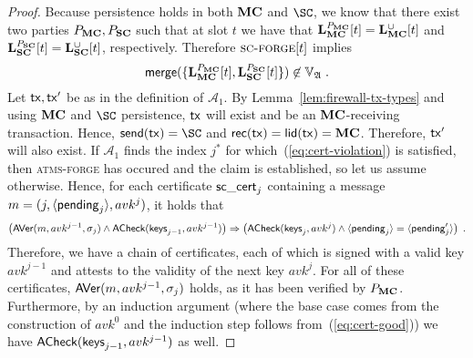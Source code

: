 \begin{proof}
  \noindent
  Because persistence holds in both $\mathbf{MC}$ and $\SC$, we know that there exist two parties $P_{\mathbf{MC}}, P_{\mathbf{SC}}$
  such that at slot $t$ we have that $\mathbf{L}_{\mathbf{MC}}^{P_{\mathbf{MC}}}[t] =
  \mathbf{L}_{\mathbf{MC}}^{\cup}[t]$ and $\mathbf{L}_{\mathbf{SC}}^{P_{\mathbf{SC}}}[t] =
  \mathbf{L}_{\mathbf{SC}}^{\cup}[t]$,
  respectively. Therefore $\textsc{sc-forge}[t]$ implies
  $$
    \mathsf{merge}(\{
      \mathbf{L}_{\mathbf{MC}}^{P_{\mathbf{MC}}}[t],
      \mathbf{L}_{\mathbf{SC}}^{P_{\mathbf{SC}}}[t]
    \}) \not\in \mathbb{V}_{\mathfrak{A}}
  \; .
  $$
  Let $\mathsf{tx}, \mathsf{tx}'$ be as in the definition of
  $\mathcal{A}_1$.
  By Lemma~\ref{lem:firewall-tx-types} and using $\mathbf{MC}$ and $\SC$
  persistence, $\mathsf{tx}$ will exist and
  be an $\mathbf{MC}$-receiving transaction.
  Hence, $\send(\tx) = \SC$ and $\mathsf{rec}(\mathsf{tx}) = \mathsf{lid}(\mathsf{tx}) = \mathbf{MC}$.
  Therefore, $\mathsf{tx}'$ will also exist.
  If $\mathcal{A}_1$ finds the index $j^*$ for which~(\ref{eq:cert-violation})
  is satisfied,
  then \textsc{atms-forge} has occured and the claim is established, so let us assume otherwise.
  Hence, for each certificate
  $\mathsf{sc\_cert}_j$ containing a message $m = (j,\langle\mathsf{pending}_j\rangle, avk^j)$, it
  holds that
  \begin{equation}
    \label{eq:cert-good}
    \left(
      \textsf{AVer}(m, avk^{j-1}, \sigma_j)
      \land
      \textsf{ACheck}(\textsf{keys}_{j-1}, avk^{j-1})
    \right)
    \Rightarrow
    \left(
      \textsf{ACheck}(\textsf{keys}_j, avk^j)
      \land
      \langle\mathsf{pending}_j\rangle = \langle\mathsf{pending}'_j\rangle
    \right)
    \; .
  \end{equation}
  Therefore, we have a chain of certificates, each of which is signed with a
  valid key $avk^{j-1}$ and attests to the validity of the next key $avk^j$.
  For all of these certificates, $\textsf{AVer}(m, avk^{j-1}, \sigma_j)$ holds,
  as it has been verified by $P_{\mathbf{MC}}$.
  Furthermore, by an induction argument (where the base case comes from the
  construction of $avk^0$ and the induction step follows
  from~(\ref{eq:cert-good})) we have
  $\textsf{ACheck}(\textsf{keys}_{j-1}, avk^{j-1})$ as well.


\end{proof}
